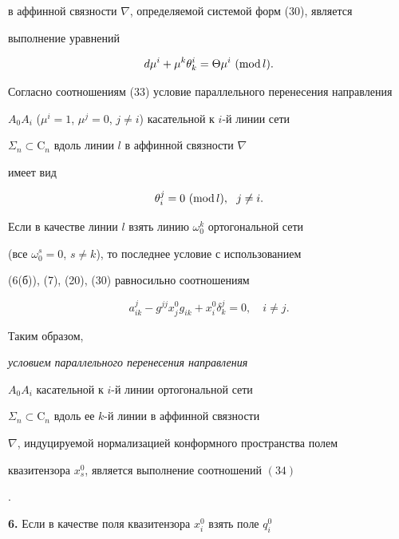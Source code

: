в аффинной связности $\nabla$, определяемой системой форм (30), является 


выполнение уравнений 


\begin{equation} 


d\mu^i+\mu^k\theta^i_k=\Theta\mu^i \ (\Mod l). 


\end{equation} 


 


Согласно соотношениям (33) условие параллельного перенесения направления 


$A_0A_i$ ($\mu^i=1$, $\mu^j=0$, $j\ne i$) касательной к $i$-й линии сети 


$\Sigma_n\subset\mathrm C_n$ вдоль линии $l$ в аффинной связности $\nabla$ 


имеет вид 


$$ 


\theta^j_i=0\ (\Mod l),\ \ j\ne i. 


$$ 


Если в качестве линии $l$ взять линию $\omega^k_0$ ортогональной сети 


(все $\omega^s_0=0$, $s\ne k$), то последнее условие с использованием 


(6(б)), (7), (20), (30) равносильно соотношениям 


\begin{equation} 


a^j_{ik}-g^{jj}x^0_j g_{ik}+x^0_i\delta^j_k=0,\quad i\ne j. 


\end{equation} 


 


Таким образом, {\it условием параллельного перенесения направления 


$A_0A_i$ касательной к $i$-й линии ортогональной сети 


$\Sigma_n\subset\mathrm C_n$ вдоль ее $k$-й линии в аффинной связности 


$\nabla$, индуцируемой нормализацией конформного пространства полем 


квазитензора $x^0_s$, является выполнение соотношений $(34)$}. 


\medskip 


 


{\bf 6.} Если в качестве поля квазитензора $x^0_i$ взять поле $q^0_i$ 


